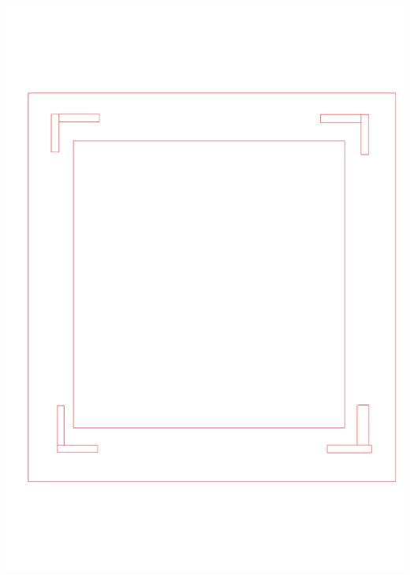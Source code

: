\begin{center}
\includegraphics[height=0.3\textheight, angle = 0]{src/ontwerp/tussenplateau.pdf}

\end{center}
